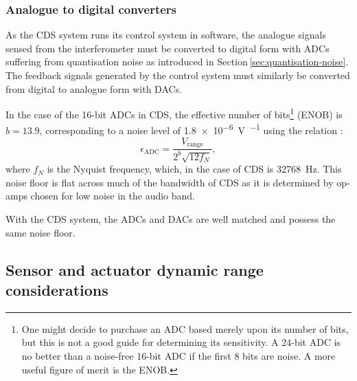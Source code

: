 \subsubsection{\label{sec:adcs-and-dacs}Analogue to digital converters}
As the \gls{CDS} system runs its control system in software, the analogue signals sensed from the interferometer must be converted to digital form with \glspl{ADC} suffering from quantisation noise as introduced in Section\,\ref{sec:quantisation-noise}. The feedback signals generated by the control system must similarly be converted from digital to analogue form with \glspl{DAC}.

In the case of the \num{16}-bit \glspl{ADC} in \gls{CDS}, the effective number of bits\footnote{One might decide to purchase an \gls{ADC} based merely upon its number of bits, but this is not a good guide for determining its sensitivity. A 24-bit \gls{ADC} is no better than a noise-free 16-bit \gls{ADC} if the first 8 bits are noise. A more useful figure of merit is the \gls{ENOB}.} (\gls{ENOB}) is $b = 13.9$, corresponding to a noise level of \SI{1.8e-6}{\volt\per\sqrthz} using the relation \cite{Allen1997}:
\begin{equation}
  \epsilon_{\text{ADC}} = \frac{V_{\text{range}}}{2^b \sqrt{12 f_{N}}},
\end{equation}
where $f_{N}$ is the Nyquist frequency, which, in the case of \gls{CDS} is \SI{32768}{\hertz}. This noise floor is flat across much of the bandwidth of \gls{CDS} as it is determined by op-amps chosen for low noise in the audio band.

With the \gls{CDS} system, the \glspl{ADC} and \glspl{DAC} are well matched and possess the same noise floor.

\subsection{\label{sec:sensors-and-actuators}Sensor and actuator dynamic range considerations}

